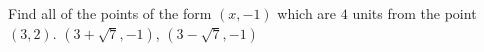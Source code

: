 {Find all of the points of the form $(x, -1)$ which are $4$ units from the point $(3,2)$.}
{$(3 + \sqrt{7}, -1)$, $(3-\sqrt{7}, -1)$}
